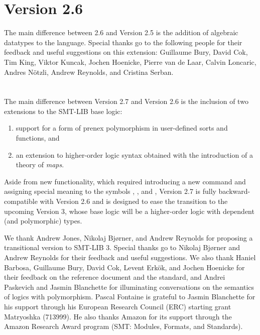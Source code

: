 \section*{Version 2.6}

The main difference between 2.6 and Version 2.5 is the addition of algebraic datatypes to the language.
Special thanks go to the following people
for their feedback and useful suggestions on this extension:
Guillaume Bury,
David Cok,
Tim King,
Viktor Kuncak,
Jochen Hoenicke,
Pierre van de Laar,
Calvin Loncaric,
Andres N{\"o}tzli,
Andrew Reynolds,
and
Cristina Serban.

\section*{\thisversion}

The main difference between Version 2.7 and Version 2.6 is the inclusion of two extensions to
the SMT-LIB base logic:
\begin{enumerate}
\item support for a form of prenex polymorphism in user-defined sorts and functions, and
\item an extension to higher-order logic syntax obtained with the introduction of a theory of \emph{maps}.
\end{enumerate}

Aside from new functionality, which required introducing
a new command and assigning special meaning 
to the symbols , , and \ter{->},  
Version 2.7 is fully backward-compatible with Version 2.6
and is designed to ease the transition to the upcoming Version 3,
whose base logic will be a higher-order logic with dependent (and polymorphic)
types.

We thank
Andrew Jones, 
Nikolaj Bj{\o}rner, and
Andrew Reynolds for proposing a transitional version to SMT-LIB 3.
Special thanks go to 
Nikolaj Bj{\o}rner and
Andrew Reynolds for their feedback and useful suggestions.
We also thank 
Haniel Barbosa,
Guillaume Bury, 
David Cok, 
Levent Erkök, and
Jochen Hoenicke
for their feedback on the reference document and the standard, and 
Andrei Paskevich and 
Jasmin Blanchette 
for illuminating conversations on the semantics of logics with polymorphism.
Pascal Fontaine is grateful to Jasmin Blanchette for his support through his European Research Council (ERC) starting grant Matryoshka (713999).  
He also thanks Amazon for its support through the Amazon Research Award program 
(SMT: Modules, Formats, and Standards).
